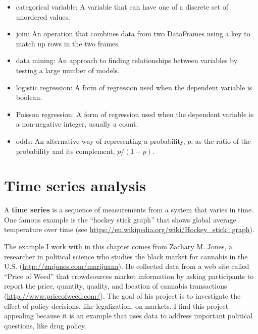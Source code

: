 \documentclass[12pt]{book}
\begin{document}
\begin{itemize}
\item categorical variable: A variable that can have one of a
discrete set of unordered values.

\item join: An operation that combines data from two DataFrames
using a key to match up rows in the two frames.

\item data mining: An approach to finding relationships between
variables by testing a large number of models.

\item logistic regression: A form of regression used when the
dependent variable is boolean.

\item Poisson regression: A form of regression used when the
dependent variable is a non-negative integer, usually a count.

\item odds: An alternative way of representing a probability, $p$, as
  the ratio of the probability and its complement, $p / (1-p)$.

\end{itemize}



\chapter{Time series analysis}

A {\bf time series} is a sequence of measurements from a system that
varies in time.  One famous example is the ``hockey stick graph'' that
shows global average temperature over time (see
\url{https://en.wikipedia.org/wiki/Hockey_stick_graph}).

The example I work with in this chapter comes from Zachary M. Jones, a
researcher in political science who studies the black market for
cannabis in the U.S.  (\url{http://zmjones.com/marijuana}).  He
collected data from a web site called ``Price of Weed'' that
crowdsources market information by asking participants to report the
price, quantity, quality, and location of cannabis transactions
(\url{http://www.priceofweed.com/}).  The goal of his project is to
investigate the effect of policy decisions, like legalization, on
markets.  I find this project appealing because it is an example that
uses data to address important political questions, like drug policy.
\end{document}
